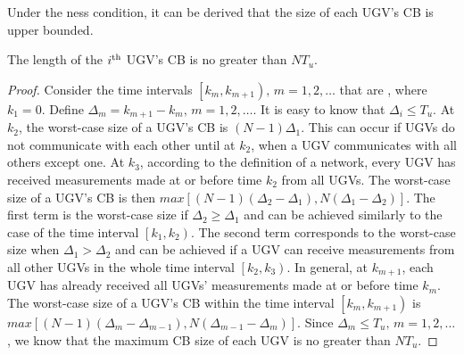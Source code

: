 	Under the \fc ness condition, it can be derived that the size of each UGV's CB is upper bounded.
	\begin{thm}\label{thm:max_CB_size}
		The length of the $i^\text{th}$ UGV's CB is no greater than $NT_u$.
	\end{thm}
	
	\begin{proof}
		Consider the time intervals $\left[k_m,k_{m+1} \right),\,m=1,2,\dots$ that are {\fc}, where $k_1=0$.
		Define $\Delta_m = k_{m+1}-k_m,\,m=1,2,\dots$.
		It is easy to know that $\Delta_i\le T_u$.
		At $k_2$, the worst-case size of a UGV's CB is $(N-1)\Delta_1$.	
		This can occur if UGVs do not communicate with each other until at $k_2$, when a UGV communicates with all others except one.
		At $k_3$, according to the definition of a \fc network, every UGV has received measurements made at or before time $k_2$ from all UGVs.
		The worst-case size of a UGV's CB is then $max \left[(N-1)(\Delta_2-\Delta_1),N(\Delta_1-\Delta_2)\right]$.  %
		The first term is the worst-case size if $\Delta_2\ge\Delta_1$ and can be achieved similarly to the case of the time interval $\left[k_1,k_2\right)$. 
		The second term corresponds to the worst-case size when $\Delta_1>\Delta_2$ and can be achieved if a UGV can receive measurements from all other UGVs in the whole time interval $\left[k_2,k_3\right)$. 
		In general, at $k_{m+1}$, each UGV has already received all UGVs' measurements made at or before time $k_m$. 
		The worst-case size of a UGV's CB within the time interval $\left[k_m,k_{m+1}\right)$ is $max\left[(N-1)(\Delta_m-\Delta_{m-1}),N(\Delta_{m-1}-\Delta_m)\right]$.
		Since $\Delta_m\le T_u,\, m=1,2,\dots$, we know that the maximum CB size of each UGV is no greater than $NT_u$.
	\end{proof}
	
	

